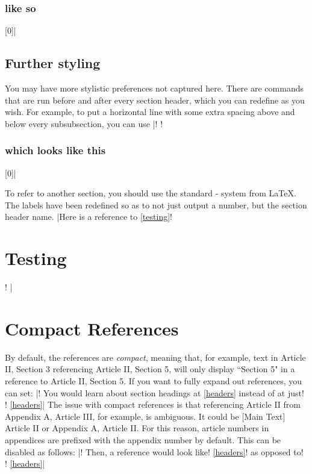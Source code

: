 \documentclass{constitution}
\begin{document}
\subsubsection{like so}[0]|
\vspace{1.5cm}

\subsection{Further styling}
You may have more stylistic preferences not captured here.
There are commands that are run before and after every section header, which you can redefine as you wish.
For example, to put a horizontal line with some extra spacing above and below every subsubsection, you can use
\coderunex|\def\subsubsectionpre{\hrule\vspace{1cm}}!
\def\subsubsectionpost{\vspace{1cm}\hrule}!
\subsubsection{which looks like this}[0]|

To refer to another section, you should use the standard \cmdex{\label}-\cmdex{\ref} system from LaTeX.
The labels have been redefined so as to not just output a number, but the section header name.
\coderunex|Here is a reference to \ref{testing}!
\section{Testing}!
\label{testing}|

\section{Compact References}
By default, the references are \textit{compact}, meaning that, for example, text in Article II, Section 3 referencing Article II, Section 5, will only display ``Section 5" in a reference to Article II, Section 5.
If you want to fully expand out references, you can set:
\coderunex|!
You would learn about section headings at \ref{headers} instead of at just!
!
\ref{headers}|
The issue with compact references is that referencing Article II from Appendix A, Article III, for example, is ambiguous.
It could be [Main Text] Article II or Appendix A, Article II.
For this reason, article numbers in appendices are prefixed with the appendix number by default.
This can be disabled as follows:
\coderunex|!
Then, a reference would look like!
\ref{headers}!
as opposed to!
!
\ref{headers}|
\end{document}
